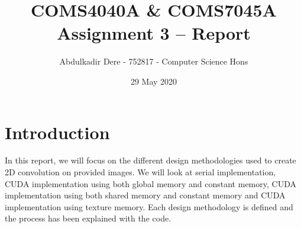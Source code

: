 

\title{COMS4040A \& COMS7045A Assignment 3 -- Report}
\author{Abdulkadir Dere - 752817 - Computer Science Hons}
\date{29 May 2020} 
\maketitle 
\pagestyle{fancy}
\fancyhf{}
\fancyhead[R]{\thepage}





\section{Introduction} 
In this report, we will focus on the different design methodologies used to create 2D convolution on provided images. We will look at serial implementation, CUDA implementation using both global memory and constant memory, CUDA implementation using both shared memory and constant memory and CUDA implementation using texture memory. Each design methodology is defined and the process has been explained with the code.

